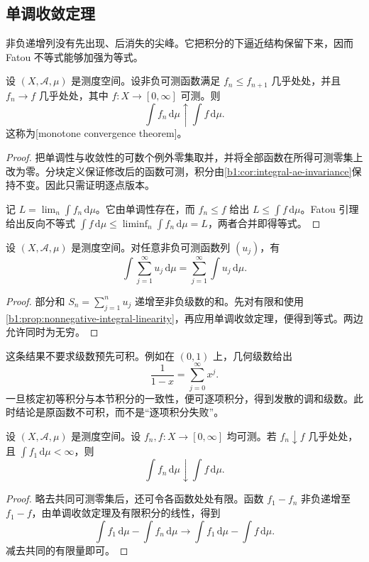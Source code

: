 \subsection{单调收敛定理}
\label{b1:subsec:050302}

非负递增列没有先出现、后消失的尖峰。它把积分的下逼近结构保留下来，因而 Fatou 不等式能够加强为等式。

\begin{theorem}[单调收敛]\label{b1:thm:monotone-convergence}
设 \((X,\mathcal A,\mu)\) 是测度空间。设非负可测函数满足 \(f_n\leq f_{n+1}\) 几乎处处，并且 \(f_n\to f\) 几乎处处，其中 \(f:X\rightarrow[0,\infty]\) 可测。则
\[
\int f_n\,\mathrm d\mu\uparrow\int f\,\mathrm d\mu.
\]
这称为[monotone convergence theorem]。
\end{theorem}
\begin{proof}
把单调性与收敛性的可数个例外零集取并，并将全部函数在所得可测零集上改为零。分块定义保证修改后的函数可测，积分由\cref{b1:cor:integral-ae-invariance}保持不变。因此只需证明逐点版本。

记 \(L=\lim_n\int f_n\,\mathrm d\mu\)。它由单调性存在，而 \(f_n\leq f\) 给出 \(L\leq\int f\,\mathrm d\mu\)。Fatou 引理给出反向不等式
\(\int f\,\mathrm d\mu\leq\liminf_n\int f_n\,\mathrm d\mu=L\)，两者合并即得等式。
\end{proof}

\begin{corollary}\label{b1:cor:nonnegative-series-integral}
设 \((X,\mathcal A,\mu)\) 是测度空间。对任意非负可测函数列 \((u_j)\)，有
\[
\int\sum_{j=1}^{\infty}u_j\,\mathrm d\mu
=\sum_{j=1}^{\infty}\int u_j\,\mathrm d\mu.
\]
\end{corollary}
\begin{proof}
部分和 \(S_n=\sum_{j=1}^{n}u_j\) 递增至非负级数的和。先对有限和使用\cref{b1:prop:nonnegative-integral-linearity}，再应用单调收敛定理，便得到等式。两边允许同时为无穷。
\end{proof}

这条结果不要求级数预先可积。例如在 \((0,1)\) 上，几何级数给出
\[
\frac1{1-x}=\sum_{j=0}^{\infty}x^j.
\]
一旦核定初等积分与本节积分的一致性，便可逐项积分，得到发散的调和级数。此时结论是原函数不可积，而不是“逐项积分失败”。

\begin{corollary}\label{b1:cor:decreasing-integral-convergence}
设 \((X,\mathcal A,\mu)\) 是测度空间。设 \(f_n,f:X\rightarrow[0,\infty]\) 均可测。若 \(f_n\downarrow f\) 几乎处处，且 \(\int f_1\,\mathrm d\mu<\infty\)，则
\[
\int f_n\,\mathrm d\mu\downarrow\int f\,\mathrm d\mu.
\]
\end{corollary}
\begin{proof}
略去共同可测零集后，还可令各函数处处有限。函数 \(f_1-f_n\) 非负递增至 \(f_1-f\)，由单调收敛定理及有限积分的线性，得到
\[
\int f_1\,\mathrm d\mu-\int f_n\,\mathrm d\mu
\longrightarrow
\int f_1\,\mathrm d\mu-\int f\,\mathrm d\mu.
\]
减去共同的有限量即可。
\end{proof}

